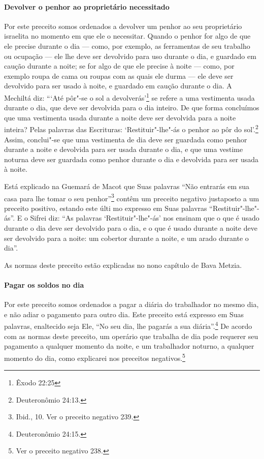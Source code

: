 \begin{multicols}{2}
\paragraph{Devolver o penhor ao proprietário necessitado}

Por este preceito somos ordenados a devolver um penhor ao seu
proprietário israelita no momento em que ele o necessitar. Quando o
penhor for algo de que ele precise durante o dia --- como, por exemplo,
as ferramentas de seu trabalho ou ocupação --- ele lhe deve ser
devolvido para uso durante o dia, e guardado em caução durante a noite;
se for algo de que ele precise à noite --- como, por exemplo roupa de
cama ou roupas com as quais ele durma --- ele deve ser devolvido para ser usado à noite, e guardado em caução
durante o dia. A Mechiltá\starr{} diz: ```Até pôr"-se o sol a devolverás'\footnote{Êxodo
22:25} se refere a uma vestimenta usada durante o dia, que deve ser
devolvida para o dia inteiro. De que forma concluímos que uma vestimenta
usada durante a noite deve ser devolvida para a noite inteira? Pelas
palavras das Escrituras: `Restituir"-lhe"-ás o penhor ao pôr do sol'.\footnote{Deuteronômio 24:13.} Assim, conclui"-se que uma vestimenta de dia deve
ser guardada como penhor durante a noite e devolvida para ser usada
durante o dia, e que uma vestime noturna deve ser guardada como penhor
durante o dia e devolvida para ser usada à noite.


Está explicado na Guemará\starr{} de Macot\starr{} que Suas palavras ``Não entrarás em sua casa para lhe tomar o seu penhor''\footnote{Ibid., 10. Ver o preceito negativo 239.} contêm um preceito
negativo justaposto a um preceito positivo, estando este últi mo
expresso em Suas palavras ``Restituir"-lhe"-ás''. E o Sifrei\starr{} diz: ``As palavras
`Restituir"-lhe"-ás' nos
ensinam que o que é usado durante o dia deve ser devolvido para o dia, e
o que é usado durante a noite deve ser devolvido para a noite: um
cobertor durante a noite, e um arado durante o dia''.

As normas deste preceito estão explicadas no nono capítulo de Bava
Metzia\starr.

\paragraph{Pagar os soldos no dia}

Por este preceito somos ordenados a pagar a diária do trabalhador no
mesmo dia, e não adiar o pagamento para outro dia. Este preceito está
expresso em Suas palavras, enaltecido seja Ele, ``No seu dia, lhe
pagarás a sua diária''.\footnote{Deuteronômio 24:15.} De acordo com as normas
deste preceito, um operário que trabalha de dia pode requerer seu
pagamento a qualquer momento da noite, e um trabalhador noturno, a
qualquer momento do dia, como explicarei nos preceitos
negativos.\footnote{Ver o preceito negativo 238.}


\end{multicols}
